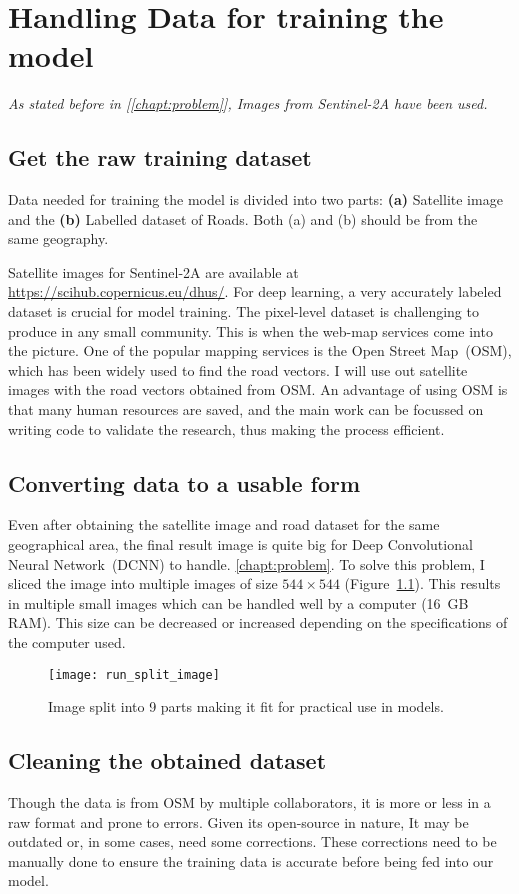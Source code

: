 \chapter{Handling Data for training the model}\label{chapt:data}
\textit{As stated before in [\ref{chapt:problem}], Images from Sentinel-2A have been used.}

\section{Get the raw training dataset}
Data needed for training the model is divided into two parts: \textbf{(a)} Satellite image and the \textbf{(b)} Labelled dataset of Roads. Both (a) and (b) should be from the same geography.

Satellite images for Sentinel-2A are available at \url{https://scihub.copernicus.eu/dhus/}. For deep learning, a very accurately labeled dataset is crucial for model training. The pixel-level dataset is challenging to produce in any small community. This is when the web-map services come into the picture. One of the popular mapping services is the Open Street Map~(OSM), which has been widely used to find the road vectors. I will use out satellite images with the road vectors obtained from OSM. An advantage of using OSM is that many human resources are saved, and the main work can be focussed on writing code to validate the research, thus making the process efficient.


\section{Converting data to a usable form}
Even after obtaining the satellite image and road dataset for the same geographical area, the final result image is quite big for Deep Convolutional Neural Network~(DCNN) to handle. \ref{chapt:problem}. To solve this problem, I sliced the image into multiple images of size $544\times544$ (Figure~\ref{fig:run_split_images}). This results in multiple small images which can be handled well by a computer (16~GB RAM). This size can be decreased or increased depending on the specifications of the computer used.
\begin{figure}[h!]
  \centering
  \texttt{[image: run\_split\_image]}
  \caption{Image split into 9 parts making it fit for practical use in models.}
  \label{fig:run_split_images}
\end{figure}


\section{Cleaning the obtained dataset}
Though the data is from OSM by multiple collaborators, it is more or less in a raw format and prone to errors. Given its open-source in nature, It may be outdated or, in some cases, need some corrections. These corrections need to be manually done to ensure the training data is accurate before being fed into our model.

